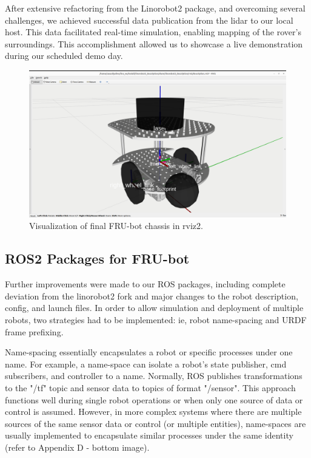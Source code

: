\documentclass[conference]{IEEEtran}
\begin{document}
After extensive refactoring from the Linorobot2 package, and overcoming several challenges, we achieved successful data publication from the lidar to our local host. This data facilitated real-time simulation, enabling mapping of the rover's surroundings. This accomplishment allowed us to showcase a live demonstration during our scheduled demo day.
\begin{figure}
	\includegraphics[width=\linewidth]{./figs/sim_robot.png}
	\caption{Visualization of final FRU-bot chassis in rviz2.}
\end{figure}
\subsection{ROS2 Packages for FRU-bot}

Further improvements were made to our ROS packages, including complete deviation from the linorobot2 fork and major changes to the robot description, config, and launch files. In order to allow simulation and deployment of multiple robots, two strategies had to be implemented: ie, robot name-spacing and URDF frame prefixing. 

Name-spacing essentially encapsulates a robot or specific processes under one name. For example, a name-space can isolate a robot's state publisher, cmd subscribers, and controller to a name. Normally, ROS publishes transformations to the "/tf" topic and sensor data to topics of format "/sensor". This approach functions well during single robot operations or when only one source of data or control is assumed. However, in more complex systems where there are multiple sources of the same sensor data or control (or multiple entities), name-spaces are usually implemented to encapsulate similar processes under the same identity (refer to Appendix D - bottom image). 
\end{document}
